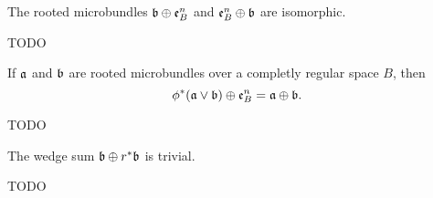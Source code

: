 \begin{mylemma}\label{suspension::commutativity}%
    The rooted microbundles $\mathfrak{b} \oplus \mathfrak{e}^n_B$ and $\mathfrak{e}^n_B \oplus \mathfrak{b}$ are isomorphic. 
\end{mylemma}
\begin{myproof}
    TODO
\end{myproof}

\begin{mytheorem}
    If $\mathfrak{a}$ and $\mathfrak{b}$ are rooted microbundles over a completly regular space $B$, then
    \[ \phi^*(\mathfrak{a} \vee \mathfrak{b}) \oplus \mathfrak{e}^n_B = \mathfrak{a} \oplus \mathfrak{b}. \]
\end{mytheorem}
\begin{myproof}
    TODO
\end{myproof}

\begin{mycorollary}
    The wedge sum $\mathfrak{b} \oplus r^*\mathfrak{b}$ is trivial.
\end{mycorollary}
\begin{myproof}
    TODO
\end{myproof}


